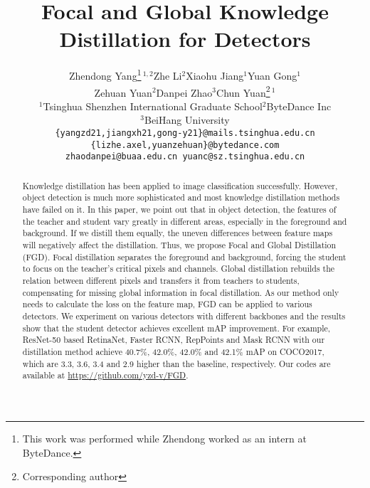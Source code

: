 \documentclass[10pt,twocolumn,letterpaper]{article}
\begin{document}
\title{Focal and Global Knowledge Distillation for Detectors}

\author{Zhendong Yang\thanks{This work was performed while Zhendong worked as an intern at ByteDance.}$^{~1,2}$\quad Zhe Li$^{2}$\quad Xiaohu Jiang$^{1}$\quad Yuan Gong$^{1}$\\ \quad Zehuan Yuan$^{2}$\quad  Danpei Zhao$^{3}$\quad Chun Yuan\thanks{Corresponding author}$^{~1}$\\
$^{1}$Tsinghua Shenzhen International Graduate School\quad $^{2}$ByteDance Inc\\$^{3}$BeiHang University\\
{\tt\small \{yangzd21,jiangxh21,gong-y21\}@mails.tsinghua.edu.cn \quad \{lizhe.axel,yuanzehuan\}@bytedance.com}\\
{\tt\small zhaodanpei@buaa.edu.cn \quad yuanc@sz.tsinghua.edu.cn}
}
\maketitle

\begin{abstract}
  Knowledge distillation has been applied to image classification successfully. However, object detection is much more sophisticated and most knowledge distillation methods have failed on it. In this paper, we point out that in object detection, the features of the teacher and student vary greatly in different areas, especially in the foreground and background. If we distill them equally, the uneven differences between feature maps will negatively affect the distillation. Thus, we propose Focal and Global Distillation (FGD). Focal distillation separates the foreground and background, forcing the student to focus on the teacher's critical pixels and channels. Global distillation rebuilds the relation between different pixels and transfers it from teachers to students, compensating for missing global information in focal distillation. As our method only needs to calculate the loss on the feature map, FGD can be applied to various detectors. We experiment on various detectors with different backbones and the results show that the student detector achieves excellent mAP improvement. For example, ResNet-50 based RetinaNet, Faster RCNN, RepPoints and Mask RCNN with our distillation method achieve 40.7\%, 42.0\%, 42.0\% and 42.1\% mAP on COCO2017, which are 3.3, 3.6, 3.4 and 2.9 higher than the baseline, respectively. Our codes are available at \url{https://github.com/yzd-v/FGD}.
\end{abstract}
\end{document}
